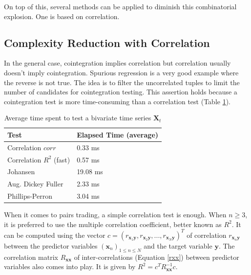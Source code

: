 \documentclass[11pt,a4,twosided,singlespacing,titlepagenumber=on]{scrreprt}
\numberwithin{equation}{chapter} %
\theoremstyle{remark}
\newcommand{\matr}[1]{\mathbf{#1}}
\begin{document}
On top of this, several methods can be applied to diminish this combinatorial explosion. One is based on correlation. 

\subsection{Complexity Reduction with Correlation}
\label{Complexity_Reduction_with_Correlation}
In the general case, cointegration implies correlation but correlation usually doesn't imply cointegration. Spurious regression is a very good example where the reverse is not true. The idea is to filter the uncorrelated tuples to limit the number of candidates for cointegration testing. This assertion holds because a cointegration test is more time-consuming than a correlation test (Table \ref{time_spent_test_bivariate}).

\begin{table}[H]
\centering
\begin{tabular}{ll}
\hline
\multicolumn{1}{|l|}{Test}     & \multicolumn{1}{l|}{Elapsed Time (average)} \\ \hline
Correlation $corr$						 &  0.33 ms \\
Correlation $R^2$ (fast)       &  0.57 ms \\
Johansen                       &  19.08 ms\\
Aug. Dickey Fuller             &  2.33 ms\\
Phillips-Perron                &  3.04 ms\\
\hline
\end{tabular}
\caption{Average time spent to test a bivariate time series $\matr{X}_t$}
\label{time_spent_test_bivariate}
\end{table}

When it comes to pairs trading, a simple correlation test is enough. When $n \geq 3$, it is preferred to use the multiple correlation coefficient, better known as $R^2$. It can be computed using the vector $c = (r_{\matr{x}_1\matr{y}}, r_{\matr{x}_2\matr{y}},...,r_{\matr{x}_N\matr{y}})^T$ of correlation $r_{\matr{x}_n\matr{y}}$ between the predictor variables $(\matr{x}_n)_{1 \leq n \leq N}$ and the target variable $\matr{y}$. The correlation matrix $R_{\matr{x}\matr{x}}$ of inter-correlations (Equation \ref{rxx}) between predictor variables also comes into play. It is given by $R^2 = c^T R_{\matr{x}\matr{x}}^{-1}c$.
\end{document}
